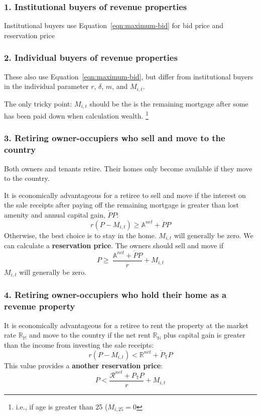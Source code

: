 \subsubsection{1. Institutional buyers of revenue properties }
Institutional buyers  use Equation~\ref{eqn:maximum-bid} for bid price and reservation price

\subsubsection{2. Individual buyers of revenue properties }
These also use Equation~\ref{eqn:maximum-bid}, but differ from institutional buyers in the individual parameter $r$, $\delta$, $m$, and $M_{i,t}$. 

The only tricky point: $M_{i,t}$ should be the is the remaining mortgage after some has been paid down when calculation wealth. \footnote{i.e., if age is greater than 25 ($M_{i,25}=0$  }  



\subsubsection{3. Retiring owner-occupiers who sell and move to the country}
Both owners and tenants retire. Their homes only become available if they move to the country. 

It is  economically advantageous for a retiree  to sell and move if the  interest on the  sale receipts after paying off the remaining mortgage is greater than lost amenity and annual capital gain, $\dot P P$:  
\[{r}(P-M_{i,t}) \ge  \mathbb{A}^{net} +\dot P P\]Otherwise, the best choice is to stay in the home. $M_{i,t}$ will generally be zero.  We can calculate a  \textbf{reservation price}. The owners should sell and move if 
\begin{equation}P \ge\ \frac{ \mathbb{A}^{net}+\dot P P}{{r}} +M_{i,t}\label{eq:movers-gainB}\end{equation}
$M_{i,t}$ will generally be zero. 


\subsubsection{4. Retiring owner-occupiers who hold their home as a revenue property}
It is  economically advantageous for a retiree to rent the property at the market rate $\mathbb{R_M}$ and move to the country if the  net rent $\mathbb{R_N}$ plus  capital gain is greater than the income from investing the sale receipts:
\[{r}(P-M_{i,t}) <  \mathbb{R}^{net} +\dot P_\mathbb{T} P\]
This value provides a \textbf{another reservation price}: 
\[P < \frac{\mathcal{R}^{net}+ P_\mathbb{T} P }{r} +M_{i,t} \label{eq:movers-gainC}\]

